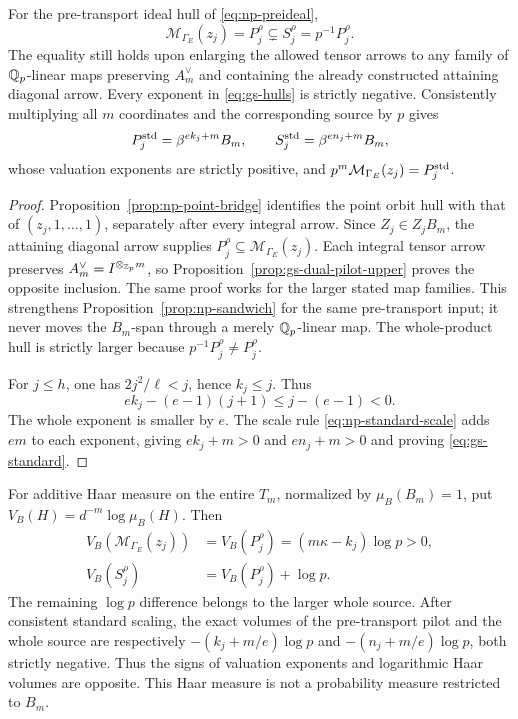 \begin{corollary}
\label{cor:gs-pilot-scale}
For the pre-transport ideal hull of \eqref{eq:np-preideal},
\begin{equation}\label{eq:gs-sandwich}
 \mathcal M_{\Gamma_E}(z_j)=P_j^\rho
           \subsetneq S_j^\rho=p^{-1}P_j^\rho.
\end{equation}
The equality still holds upon enlarging the allowed tensor arrows
to any family of $\mathbb Q_p$-linear maps preserving $A_m^\vee$ and
containing the already constructed attaining diagonal arrow.
Every exponent in \eqref{eq:gs-hulls} is strictly negative.
Consistently multiplying all $m$ coordinates and the corresponding
source by $p$ gives
\begin{equation}\label{eq:gs-standard}
 P_j^{\rm std}=\beta^{e k_j+m}B_m,\qquad
 S_j^{\rm std}=\beta^{e n_j+m}B_m,
\end{equation}
whose valuation exponents are strictly positive, and
$p^m\mathcal M_{\Gamma_E}(z_j)=P_j^{\rm std}$.
\end{corollary}
\begin{proof}
Proposition~\ref{prop:np-point-bridge} identifies the point orbit
hull with that of $(z_j,1,\ldots,1)$, separately after every
integral arrow. Since $Z_j\in Z_jB_m$, the attaining diagonal
arrow supplies $P_j^\rho\subseteq\mathcal M_{\Gamma_E}(z_j)$.
Each integral tensor arrow preserves $A_m^\vee=I^{\otimes_{\mathbb Z_p}m}$,
so Proposition~\ref{prop:gs-dual-pilot-upper} proves the opposite
inclusion. The same proof works for the larger stated map families.
This strengthens Proposition~\ref{prop:np-sandwich} for the same
pre-transport input; it never moves the $B_m$-span through a
merely $\mathbb Q_p$-linear map. The whole-product hull is strictly larger
because $p^{-1}P_j^\rho\ne P_j^\rho$.

For $j\le h$, one has $2j^2/\ell<j$, hence $k_j\le j$. Thus
\[
 e k_j-(e-1)(j+1)\le j-(e-1)<0.
\]
The whole exponent is smaller by $e$. The scale rule
\eqref{eq:np-standard-scale} adds $em$ to each exponent, giving
$e k_j+m>0$ and $e n_j+m>0$ and proving \eqref{eq:gs-standard}.
\end{proof}

For additive Haar measure on the entire $T_m$, normalized by
$\mu_B(B_m)=1$, put $V_B(H)=d^{-m}\log\mu_B(H)$. Then
\begin{equation}\label{eq:gs-pilot-volume}
 \begin{aligned}
 V_B(\mathcal M_{\Gamma_E}(z_j))
    &=V_B(P_j^\rho)=(m\kappa-k_j)\log p>0,\\
 V_B(S_j^\rho)&=V_B(P_j^\rho)+\log p.
 \end{aligned}
\end{equation}
The remaining $\log p$ difference belongs to the larger whole
source. After consistent standard scaling, the exact volumes of
the pre-transport pilot and the whole source are respectively
$-(k_j+m/e)\log p$ and $-(n_j+m/e)\log p$, both strictly negative.
Thus the signs of valuation exponents and logarithmic Haar volumes
are opposite. This Haar measure is not a probability measure
restricted to $B_m$.

